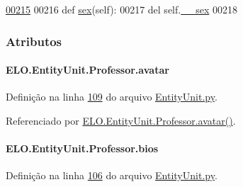 \begin{DoxyCode}
\hypertarget{classELO_1_1EntityUnit_1_1Professor_l00215}{}\hyperlink{classELO_1_1EntityUnit_1_1Professor_a2244fa9a5f02a5845cc6c0686b2cf08a}{00215} 
00216     \textcolor{keyword}{def }\hyperlink{classELO_1_1EntityUnit_1_1Professor_ac049dc360c4af27037158e33577288e1}{sex}(self):
00217         del self.\hyperlink{classELO_1_1EntityUnit_1_1Professor_ad039f8756667f0f92ce17edf73a084fe}{\_\_sex}
00218 

\end{DoxyCode}


\subsubsection{Atributos}
\hypertarget{classELO_1_1EntityUnit_1_1Professor_a593a0636e87dcdd9ced2e6b7494a45dc}{
\paragraph[{avatar}]{\setlength{\rightskip}{0pt plus 5cm}E\-L\-O.\-Entity\-Unit.\-Professor.\-avatar}}\label{classELO_1_1EntityUnit_1_1Professor_a593a0636e87dcdd9ced2e6b7494a45dc}


Definição na linha \hyperlink{EntityUnit_8py_source_l00109}{109} do arquivo \hyperlink{EntityUnit_8py_source}{Entity\-Unit.\-py}.



Referenciado por \hyperlink{classELO_1_1EntityUnit_1_1Professor_a158f4ccf788610ba580639216b621c5b}{E\-L\-O.\-Entity\-Unit.\-Professor.\-avatar()}.

\hypertarget{classELO_1_1EntityUnit_1_1Professor_a2e403e0bfc353dcdf9988140d61d5ca7}{
\paragraph[{bios}]{\setlength{\rightskip}{0pt plus 5cm}E\-L\-O.\-Entity\-Unit.\-Professor.\-bios}}\label{classELO_1_1EntityUnit_1_1Professor_a2e403e0bfc353dcdf9988140d61d5ca7}


Definição na linha \hyperlink{EntityUnit_8py_source_l00106}{106} do arquivo \hyperlink{EntityUnit_8py_source}{Entity\-Unit.\-py}.



